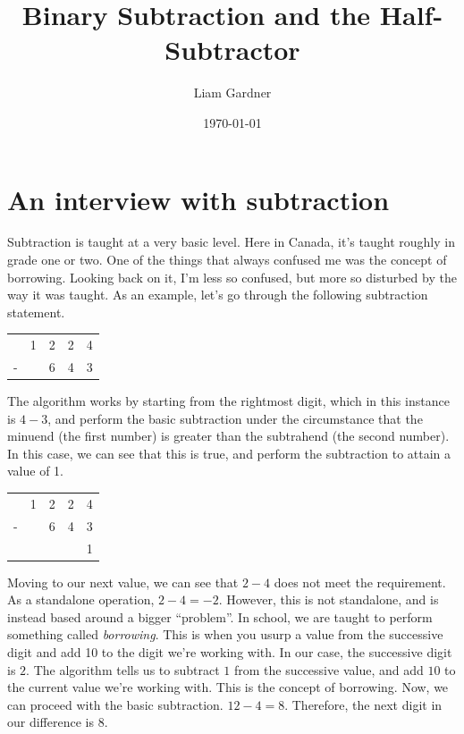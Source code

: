 \documentclass[oneside]{book}
\title{Binary Subtraction and the Half-Subtractor}
\author{Liam Gardner}
\date{\today}
\begin{document}
\newcommand\tab[1][1cm]{\hspace*{#1}}

\maketitle
\tableofcontents
\chapter{An interview with subtraction}
\tab
Subtraction is taught at a very basic level. Here in Canada, it's taught roughly in grade one or two. One of the things that always confused me was the concept of borrowing. Looking back on it, I'm less so confused, but more so disturbed by the way it was taught. As an example, let's go through the following subtraction statement.
\begin{center}
\begin{tabular}{c c c c c}
& 1 & 2 & 2 & 4 \\
- & & 6 & 4 & 3 \\
\end{tabular}
\end{center}
\tab
The algorithm works by starting from the rightmost digit, which in this instance is $4-3$, and perform the basic subtraction under the circumstance that the minuend (the first number) is greater than the subtrahend (the second number). In this case, we can see that this is true, and perform the subtraction to attain a value of 1.
\begin{center}
\begin{tabular}{c c c c c}
& 1 & 2 & 2 & 4 \\
- & & 6 & 4 & 3 \\
\hline
& & & & 1 \\
\end{tabular}
\end{center}
\tab
Moving to our next value, we can see that $2-4$ does not meet the requirement. As a standalone operation, $2-4=-2$. However, this is not standalone, and is instead based around a bigger ``problem''. In school, we are taught to perform something called \textit{borrowing}. This is when you usurp a value from the successive digit and add 10 to the digit we're working with. In our case, the successive digit is $2$. The algorithm tells us to subtract $1$ from the successive value, and add $10$ to the current value we're working with. This is the concept of borrowing. Now, we can proceed with the basic subtraction. $12-4 = 8$. Therefore, the next digit in our difference is $8$.
\end{document}
